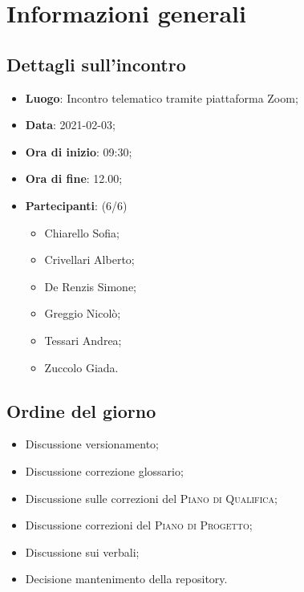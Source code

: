 \section{Informazioni generali}

\subsection{Dettagli sull'incontro}
\begin{itemize}
\item \textbf{Luogo}: Incontro telematico tramite piattaforma Zoom;
\item \textbf{Data}: 2021-02-03;
\item \textbf{Ora di inizio}: 09:30;
\item \textbf{Ora di fine}: 12.00;
\item \textbf{Partecipanti}: (6/6)
\begin{itemize}
	\item Chiarello Sofia;
    \item Crivellari Alberto;
    \item De Renzis Simone;
    \item Greggio Nicolò;
    \item Tessari Andrea;
    \item Zuccolo Giada.
\end{itemize}
\end{itemize}

\subsection{Ordine del giorno}
\begin{itemize}
	\item Discussione versionamento;
	\item Discussione correzione glossario;
	\item Discussione sulle correzioni del \textsc{Piano di Qualifica};
	\item Discussione correzioni del \textsc{Piano di Progetto};
	\item Discussione sui verbali;
	\item Decisione mantenimento della repository.
\end{itemize}



